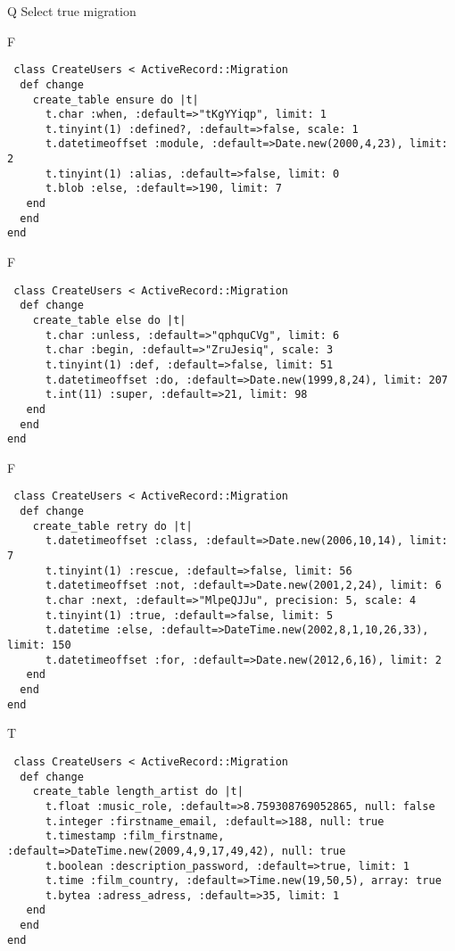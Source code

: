 Q
Select true migration

F
\begin{verbatim}
 class CreateUsers < ActiveRecord::Migration 
  def change 
    create_table ensure do |t| 
      t.char :when, :default=>"tKgYYiqp", limit: 1
      t.tinyint(1) :defined?, :default=>false, scale: 1
      t.datetimeoffset :module, :default=>Date.new(2000,4,23), limit: 2
      t.tinyint(1) :alias, :default=>false, limit: 0
      t.blob :else, :default=>190, limit: 7
   end 
  end 
end
\end{verbatim}

F
\begin{verbatim}
 class CreateUsers < ActiveRecord::Migration 
  def change 
    create_table else do |t| 
      t.char :unless, :default=>"qphquCVg", limit: 6
      t.char :begin, :default=>"ZruJesiq", scale: 3
      t.tinyint(1) :def, :default=>false, limit: 51
      t.datetimeoffset :do, :default=>Date.new(1999,8,24), limit: 207
      t.int(11) :super, :default=>21, limit: 98
   end 
  end 
end
\end{verbatim}

F
\begin{verbatim}
 class CreateUsers < ActiveRecord::Migration 
  def change 
    create_table retry do |t| 
      t.datetimeoffset :class, :default=>Date.new(2006,10,14), limit: 7
      t.tinyint(1) :rescue, :default=>false, limit: 56
      t.datetimeoffset :not, :default=>Date.new(2001,2,24), limit: 6
      t.char :next, :default=>"MlpeQJJu", precision: 5, scale: 4
      t.tinyint(1) :true, :default=>false, limit: 5
      t.datetime :else, :default=>DateTime.new(2002,8,1,10,26,33), limit: 150
      t.datetimeoffset :for, :default=>Date.new(2012,6,16), limit: 2
   end 
  end 
end
\end{verbatim}

T
\begin{verbatim}
 class CreateUsers < ActiveRecord::Migration 
  def change 
    create_table length_artist do |t| 
      t.float :music_role, :default=>8.759308769052865, null: false
      t.integer :firstname_email, :default=>188, null: true
      t.timestamp :film_firstname, :default=>DateTime.new(2009,4,9,17,49,42), null: true
      t.boolean :description_password, :default=>true, limit: 1
      t.time :film_country, :default=>Time.new(19,50,5), array: true
      t.bytea :adress_adress, :default=>35, limit: 1
   end 
  end 
end
\end{verbatim}
